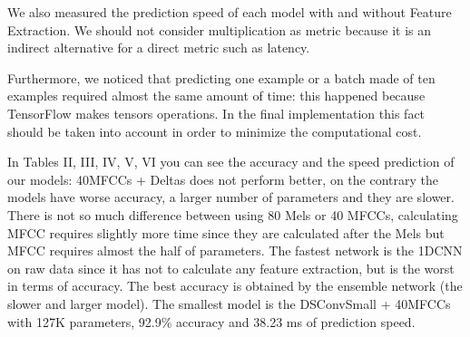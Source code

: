 \documentclass[conference]{IEEEtran}
\begin{document}
We also measured the prediction speed of each model with and without Feature Extraction. We should not consider multiplication as metric because it is an indirect alternative for a direct metric such as latency.

Furthermore, we noticed that predicting one example or a batch made of ten examples required almost the same amount of time: this happened because TensorFlow makes tensors operations. In the final implementation this fact should be taken into account in order to minimize the computational cost.

In Tables II, III, IV, V, VI you can see the accuracy and the speed prediction of our models: 40MFCCs + Deltas does not perform better, on the contrary the models have worse accuracy, a larger number of parameters and they are slower.
There is not so much difference between using 80 Mels or 40 MFCCs, calculating MFCC requires slightly more time since they are calculated after the Mels but MFCC requires almost the half of parameters.
The fastest network is the 1DCNN on raw data since it has not to calculate any feature extraction, but is the worst in terms of accuracy.
The best accuracy is obtained by the ensemble network (the slower and larger model).
The smallest model is the DSConvSmall + 40MFCCs with 127K parameters, 92.9\% accuracy and 38.23 ms of prediction speed.
\begin{center}
\begin{table}[]
\begin{center}
\caption{1DCNN performances on 10 and 21-commands datasets.}
\end{center}
\end{table}
\end{center}
\end{document}
